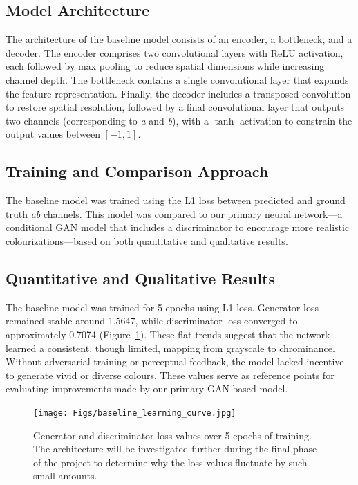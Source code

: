 \documentclass{article} %
\begin{document}
\subsection{Model Architecture}

The architecture of the baseline model consists of an encoder, a bottleneck, and a decoder. The encoder comprises two convolutional layers with ReLU activation, each followed by max pooling to reduce spatial dimensions while increasing channel depth. The bottleneck contains a single convolutional layer that expands the feature representation. Finally, the decoder includes a transposed convolution to restore spatial resolution, followed by a final convolutional layer that outputs two channels (corresponding to \textit{a} and \textit{b}), with a $\tanh$ activation to constrain the output values between $[-1, 1]$.

\subsection{Training and Comparison Approach}

The baseline model was trained using the L1 loss between predicted and ground truth \textit{ab} channels. This model was compared to our primary neural network---a conditional GAN model that includes a discriminator to encourage more realistic colourizations---based on both quantitative and qualitative results.

\subsection{Quantitative and Qualitative Results}

The baseline model was trained for 5 epochs using L1 loss. Generator loss remained stable around 1.5647, while discriminator loss converged to approximately 0.7074 (Figure~\ref{fig:baseline_curve}). These flat trends suggest that the network learned a consistent, though limited, mapping from grayscale to chrominance. Without adversarial training or perceptual feedback, the model lacked incentive to generate vivid or diverse colours. These values serve as reference points for evaluating improvements made by our primary GAN-based model.

\begin{figure}[htbp]
    \centering
    \texttt{[image: Figs/baseline\_learning\_curve.jpg]}
    \caption{Generator and discriminator loss values over 5 epochs of training. The architecture will be investigated further during the final phase of the project to determine why 
    the loss values fluctuate by such small amounts.}

    \label{fig:baseline_curve}
\end{figure}
\end{document}
